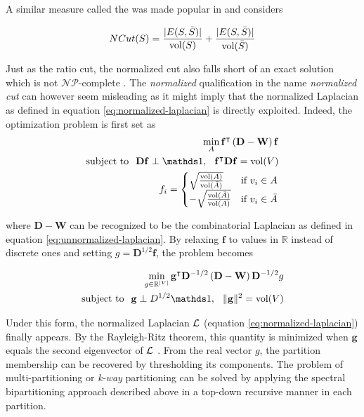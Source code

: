 A similar measure called the  was made popular in \cite{ShiMalik2000} and considers

\begin{equation}
NCut(S) = \frac{|E(S, \bar{S})|}{\operatorname{\text{vol}}(S)} + \frac{|E(S, \bar{S})|}{\operatorname{\text{vol}}(\bar{S})}
\label{eq:ncut}
\end{equation}

Just as the ratio cut, the normalized cut also falls short of an exact solution which is not
$\mathcal{NP}$-complete \cite{ShiMalik2000}. The \textit{normalized} qualification in
the name \textit{normalized cut} can however seem misleading as it might imply that
the normalized Laplacian as defined in equation \ref{eq:normalized-laplacian} is directly
exploited. Indeed, the optimization problem is first set \cite{Luxburg2007} as
\begin{align}
\min_A \mathbf{f}^\transpose \left( \mathbf{D} - \mathbf{W} \right) \mathbf{f} \\
\text{subject to} \hspace{2.5mm} \mathbf{D} \mathbf{f} \perp \indicator, \hspace{2.5mm}  \mathbf{f}^\transpose \mathbf{D} \mathbf{f} = \vol(V) \notag \\
f_i = \begin{cases}
\sqrt{\frac{\vol(A)}{\vol(\bar{A})}} & \text{if $v_i \in A$} \\
-\sqrt{\frac{\vol(\bar{A})}{\vol(A)}} & \text{if $v_i \in \bar{A}$} 
\end{cases} \notag
\end{align}

where $\mathbf{D} - \mathbf{W}$ can be recognized to be the combinatorial Laplacian
as defined in equation \ref{eq:unnormalized-laplacian}.  By relaxing $\mathbf{f}$ to 
values in $\mathbb{R}$ instead of discrete ones and setting $g = \mathbf{D}^{1/2}
\mathbf{f}$, the problem becomes

\begin{align}
\min_{g \in \mathbb{R}^{|V|}} \mathbf{g}^\transpose\mathbf{D}^{-1/2}\left( \mathbf{D} - \mathbf{W} \right) \mathbf{D}^{-1/2} g \\
\text{subject to} \hspace{2.5mm} \mathbf{g} \perp D^{1/2} \indicator, \hspace{2.5mm}  \| \mathbf{g} \|^2 = \vol(V) \notag \\
\end{align}

Under this form, the normalized Laplacian $\mathbf{\mathcal{L}}$ (equation 
\ref{eq:normalized-laplacian}) finally appears. By the Rayleigh-Ritz theorem, this
quantity is minimized when $\mathbf{g}$ equals the second eigenvector of $\mathbf{\mathcal{L}}$
\cite{Chung1997}. From the real vector $g$, the partition membership can be recovered
by thresholding its components. The problem of multi-partitioning or \textit{k-way} partitioning can be solved by applying the spectral bipartitioning approach described above in a top-down recursive manner in each partition.

